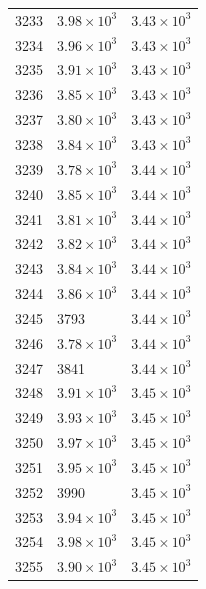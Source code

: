 \begin{table}[H]
\begin{tabular}{lll}
3233 & $\displaystyle 3.98 \times 10^{3}$ & $\displaystyle 3.43 \times 10^{3}$ \\
3234 & $\displaystyle 3.96 \times 10^{3}$ & $\displaystyle 3.43 \times 10^{3}$ \\
3235 & $\displaystyle 3.91 \times 10^{3}$ & $\displaystyle 3.43 \times 10^{3}$ \\
3236 & $\displaystyle 3.85 \times 10^{3}$ & $\displaystyle 3.43 \times 10^{3}$ \\
3237 & $\displaystyle 3.80 \times 10^{3}$ & $\displaystyle 3.43 \times 10^{3}$ \\
3238 & $\displaystyle 3.84 \times 10^{3}$ & $\displaystyle 3.43 \times 10^{3}$ \\
3239 & $\displaystyle 3.78 \times 10^{3}$ & $\displaystyle 3.44 \times 10^{3}$ \\
3240 & $\displaystyle 3.85 \times 10^{3}$ & $\displaystyle 3.44 \times 10^{3}$ \\
3241 & $\displaystyle 3.81 \times 10^{3}$ & $\displaystyle 3.44 \times 10^{3}$ \\
3242 & $\displaystyle 3.82 \times 10^{3}$ & $\displaystyle 3.44 \times 10^{3}$ \\
3243 & $\displaystyle 3.84 \times 10^{3}$ & $\displaystyle 3.44 \times 10^{3}$ \\
3244 & $\displaystyle 3.86 \times 10^{3}$ & $\displaystyle 3.44 \times 10^{3}$ \\
3245 & 3793 & $\displaystyle 3.44 \times 10^{3}$ \\
3246 & $\displaystyle 3.78 \times 10^{3}$ & $\displaystyle 3.44 \times 10^{3}$ \\
3247 & 3841 & $\displaystyle 3.44 \times 10^{3}$ \\
3248 & $\displaystyle 3.91 \times 10^{3}$ & $\displaystyle 3.45 \times 10^{3}$ \\
3249 & $\displaystyle 3.93 \times 10^{3}$ & $\displaystyle 3.45 \times 10^{3}$ \\
3250 & $\displaystyle 3.97 \times 10^{3}$ & $\displaystyle 3.45 \times 10^{3}$ \\
3251 & $\displaystyle 3.95 \times 10^{3}$ & $\displaystyle 3.45 \times 10^{3}$ \\
3252 & 3990 & $\displaystyle 3.45 \times 10^{3}$ \\
3253 & $\displaystyle 3.94 \times 10^{3}$ & $\displaystyle 3.45 \times 10^{3}$ \\
3254 & $\displaystyle 3.98 \times 10^{3}$ & $\displaystyle 3.45 \times 10^{3}$ \\
3255 & $\displaystyle 3.90 \times 10^{3}$ & $\displaystyle 3.45 \times 10^{3}$ \\

\end{tabular}
\end{table}
